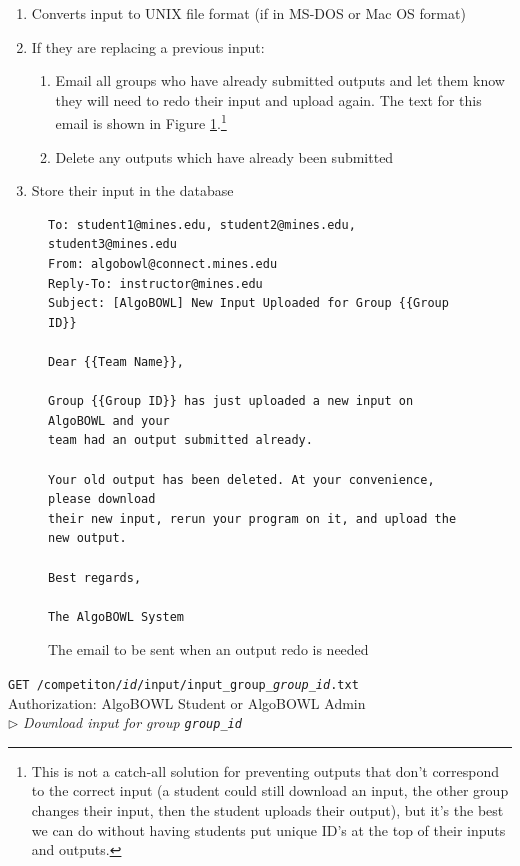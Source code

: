 \documentclass[12pt]{article}
\newcommand\ctrltitle[1]{\par\medskip\texttt{\large #1}\\}
\newcommand\ctrlauth[1]{Authorization: #1\\}
\newcommand\ctrldesc[1]{$\rhd$ \textsl{#1}\par\medskip}
\begin{document}
\begin{enumerate}
    \item Converts input to UNIX file format (if in MS-DOS or Mac OS format)
    \item If they are replacing a previous input:
        \begin{enumerate}
            \item Email all groups who have already submitted outputs and let
                them know they will need to redo their input and upload again.
                The text for this email is shown in Figure
                \ref{emailredo}.\footnote{This is not a catch-all solution for
                preventing outputs that don't correspond to the correct input
                (a student could still download an input, the other group
                changes their input, then the student uploads their output),
                but it's the best we can do without having students put unique
                ID's at the top of their inputs and outputs.}
            \item Delete any outputs which have already been submitted
        \end{enumerate}
    \item Store their input in the database
\end{enumerate}

\begin{figure}[H]
\begin{verbatim}
To: student1@mines.edu, student2@mines.edu, student3@mines.edu
From: algobowl@connect.mines.edu
Reply-To: instructor@mines.edu
Subject: [AlgoBOWL] New Input Uploaded for Group {{Group ID}}

Dear {{Team Name}},

Group {{Group ID}} has just uploaded a new input on AlgoBOWL and your
team had an output submitted already.

Your old output has been deleted. At your convenience, please download
their new input, rerun your program on it, and upload the new output.

Best regards,

The AlgoBOWL System
\end{verbatim}
    \caption{The email to be sent when an output redo is needed}
    \label{emailredo}
\end{figure}

\ctrltitle{GET /competiton/\emph{id}/input/input\_group\_\emph{group\_id}.txt}
\ctrlauth{AlgoBOWL Student or AlgoBOWL Admin}
\ctrldesc{Download input for group \texttt{group\_id}}
\end{document}
